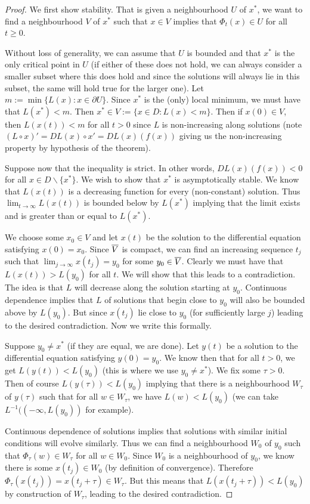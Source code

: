 \begin{proof}
We first show stability. That is given a neighbourhood $U$ of $x^*$, we want to find a neighbourhood $V$ of $x^*$ such that $x \in V$ implies that $\Phi_t(x) \in U$ for all $t \geq 0$.

Without loss of generality, we can assume that $U$ is bounded and that $x^*$ is the only critical point in $U$ (if either of these does not hold, we can always consider a smaller subset where this does hold and since the solutions will always lie in this subset, the same will hold true for the larger one). Let $m := \min \{ L(x): x \in \partial U \}$. Since $x^*$ is the (only) local minimum, we must have that $L(x^*) < m$. Then $x^* \in V := \{x \in D: L(x) < m\}$. Then if $x(0) \in V$, then $L(x(t)) < m$ for all $t > 0$ since $L$ is non-increasing along solutions (note $(L \circ x)' = DL(x) \circ x' = DL(x) (f(x))$ giving us the non-increasing property by hypothesis of the theorem). 

Suppose now that the inequality is strict. In other words, $DL(x) (f(x)) < 0$ for all $x \in D \backslash \{x^*\}$. We wish to show that $x^*$ is asymptotically stable. We know that $L(x(t))$ is a decreasing function for every (non-constant) solution. Thus $\lim_{t \to \infty} L(x(t))$ is bounded below by $L(x^*)$ implying that the limit exists and is greater than or equal to $L(x^*)$. 

We choose some $x_0 \in V$ and let $x(t)$ be the solution to the differential equation satisfying $x(0) = x_0$. Since $\overline{V}$ is compact, we can find an increasing sequence $t_j$ such that $\lim_{j \to \infty} x(t_j) = y_0$ for some $y_0 \in \overline{V}$. Clearly we must have that $L(x(t)) > L(y_0)$ for all $t$. We will show that this leads to a contradiction. The idea is that $L$ will decrease along the solution starting at $y_0$. Continuous dependence implies that $L$ of solutions that begin close to $y_0$ will also be bounded above by $L(y_0)$. But since $x(t_j)$ lie close to $y_0$ (for sufficiently large $j$) leading to the desired contradiction. Now we write this formally.

Suppose $y_0 \neq x^*$ (if they are equal, we are done). Let $y(t)$ be a solution to the differential equation satisfying $y(0) = y_0$. We know then that for all $t > 0$, we get $L(y(t)) < L(y_0)$ (this is where we use $y_0 \neq x^*$). We fix some $\tau > 0$. Then of course $L(y(\tau)) < L(y_0)$ implying that there is a neighbourhood $W_{\tau}$ of $y(\tau)$ such that for all $w \in W_\tau$, we have $L(w) < L(y_0)$ (we can take $L^{-1}((-\infty, L(y_0))$ for example). 

Continuous dependence of solutions implies that solutions with similar initial conditions will evolve similarly. Thus we can find a neighbourhood $W_0$ of $y_0$ such that $\Phi_{\tau}(w) \in W_\tau$ for all $w \in W_0$. Since $W_0$ is a neighbourhood of $y_0$, we know there is some $x(t_j) \in W_0$ (by definition of convergence). Therefore $\Phi_{\tau}(x(t_j)) = x(t_j + \tau) \in W_\tau$. But this means that $L(x(t_j + \tau)) < L(y_0)$ by construction of $W_\tau$, leading to the desired contradiction.
\end{proof}

